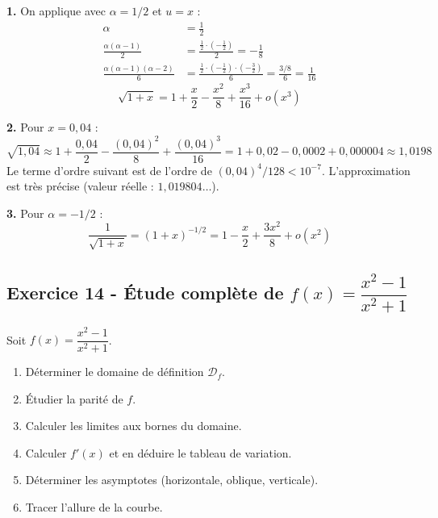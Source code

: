 \documentclass[12pt,a4paper]{article}
\begin{document}
\begin{boitecorrige}
\textbf{1.} On applique avec $\alpha = 1/2$ et $u = x$ :
\begin{align*}
\alpha &= \tfrac{1}{2} \\
\frac{\alpha(\alpha-1)}{2} &= \frac{\tfrac{1}{2}\cdot(-\tfrac{1}{2})}{2} = -\frac{1}{8} \\
\frac{\alpha(\alpha-1)(\alpha-2)}{6} &= \frac{\tfrac{1}{2}\cdot(-\tfrac{1}{2})\cdot(-\tfrac{3}{2})}{6} = \frac{3/8}{6} = \frac{1}{16}
\end{align*}
\[
\sqrt{1+x} = 1 + \frac{x}{2} - \frac{x^2}{8} + \frac{x^3}{16} + o(x^3)
\]

\textbf{2.} Pour $x = 0{,}04$ :
\[
\sqrt{1{,}04} \approx 1 + \frac{0{,}04}{2} - \frac{(0{,}04)^2}{8} + \frac{(0{,}04)^3}{16}
= 1 + 0{,}02 - 0{,}0002 + 0{,}000004 \approx 1{,}0198
\]
Le terme d'ordre suivant est de l'ordre de $(0{,}04)^4/128 < 10^{-7}$. L'approximation est très précise (valeur réelle : $1{,}019804\ldots$).

\textbf{3.} Pour $\alpha = -1/2$ :
\[
\frac{1}{\sqrt{1+x}} = (1+x)^{-1/2} = 1 - \frac{x}{2} + \frac{3x^2}{8} + o(x^2)
\]
\end{boitecorrige}

\subsection*{Exercice 14 - Étude complète de $f(x)=\dfrac{x^2-1}{x^2+1}$ \niveau{\moyen}}
\begin{boiteexercice}
Soit $f(x) = \dfrac{x^2-1}{x^2+1}$.

\begin{enumerate}
  \item Déterminer le domaine de définition $\mathcal{D}_f$.
  \item Étudier la parité de $f$.
  \item Calculer les limites aux bornes du domaine.
  \item Calculer $f'(x)$ et en déduire le tableau de variation.
  \item Déterminer les asymptotes (horizontale, oblique, verticale).
  \item Tracer l'allure de la courbe.
\end{enumerate}
\end{boiteexercice}
\end{document}
